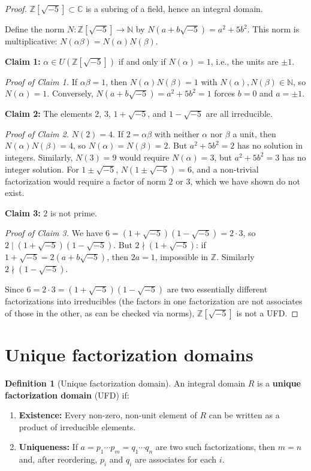 \documentclass[12pt,a4paper,openany]{book}
\theoremstyle{definition}
\newtheorem{definition}{Definition}[chapter]
\theoremstyle{remark}
\begin{document}
\begin{proof}
$\mathbb{Z}[\sqrt{-5}]\subset\mathbb{C}$ is a subring of a field, hence an integral domain.

Define the norm $N\colon\mathbb{Z}[\sqrt{-5}]\to\mathbb{N}$ by $N(a+b\sqrt{-5})=a^2+5b^2$. This norm is multiplicative: $N(\alpha\beta)=N(\alpha)N(\beta)$.

\textbf{Claim 1:} $\alpha\in U(\mathbb{Z}[\sqrt{-5}])$ if and only if $N(\alpha)=1$, i.e., the units are $\pm 1$.

\emph{Proof of Claim 1.} If $\alpha\beta=1$, then $N(\alpha)N(\beta)=1$ with $N(\alpha),N(\beta)\in\mathbb{N}$, so $N(\alpha)=1$. Conversely, $N(a+b\sqrt{-5})=a^2+5b^2=1$ forces $b=0$ and $a=\pm 1$.

\textbf{Claim 2:} The elements $2$, $3$, $1+\sqrt{-5}$, and $1-\sqrt{-5}$ are all irreducible.

\emph{Proof of Claim 2.} $N(2)=4$. If $2=\alpha\beta$ with neither $\alpha$ nor $\beta$ a unit, then $N(\alpha)N(\beta)=4$, so $N(\alpha)=N(\beta)=2$. But $a^2+5b^2=2$ has no solution in integers. Similarly, $N(3)=9$ would require $N(\alpha)=3$, but $a^2+5b^2=3$ has no integer solution. For $1\pm\sqrt{-5}$, $N(1\pm\sqrt{-5})=6$, and a non-trivial factorization would require a factor of norm $2$ or $3$, which we have shown do not exist.

\textbf{Claim 3:} $2$ is not prime.

\emph{Proof of Claim 3.} We have $6=(1+\sqrt{-5})(1-\sqrt{-5})=2\cdot 3$, so $2\mid(1+\sqrt{-5})(1-\sqrt{-5})$. But $2\nmid(1+\sqrt{-5})$: if $1+\sqrt{-5}=2(a+b\sqrt{-5})$, then $2a=1$, impossible in $\mathbb{Z}$. Similarly $2\nmid(1-\sqrt{-5})$.

Since $6=2\cdot 3=(1+\sqrt{-5})(1-\sqrt{-5})$ are two essentially different factorizations into irreducibles (the factors in one factorization are not associates of those in the other, as can be checked via norms), $\mathbb{Z}[\sqrt{-5}]$ is not a UFD.
\end{proof}

\section{Unique factorization domains}\label{sec:UFD}

\begin{definition}[Unique factorization domain]\label{def:UFD}
An integral domain $R$ is a \textbf{unique factorization domain} (UFD) if:
\begin{enumerate}[label=(\roman*)]
    \item \textbf{Existence:} Every non-zero, non-unit element of $R$ can be written as a product of irreducible elements.
    \item \textbf{Uniqueness:} If $a=p_1\cdots p_m=q_1\cdots q_n$ are two such factorizations, then $m=n$ and, after reordering, $p_i$ and $q_i$ are associates for each $i$.
\end{enumerate}
\end{definition}
\end{document}
